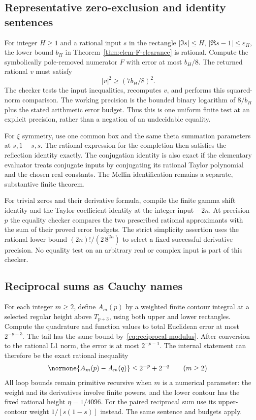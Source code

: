 \subsection{Representative zero-exclusion and identity sentences}
For integer $H\ge1$ and a rational input $s$ in the rectangle
$|\Im s|\le H$, $|\Re s-1|\le\varepsilon_H$, the lower bound
$b_H$ in Theorem~\ref{thm:elem-F-clearance} is rational. Compute the
symbolically pole-removed numerator $F$ with error at most $b_H/8$.
The returned rational $v$ must satisfy
\[
                         |v|^2\ge(7b_H/8)^2.
\]
The checker tests the input inequalities, recomputes $v$, and performs
this squared-norm comparison. The working precision is the bounded
binary logarithm of $8/b_H$ plus the stated arithmetic error budget.
Thus this is one uniform finite test at an explicit precision, rather
than a negation of an undecidable equality.

For $\xi$ symmetry, use one common box and the same theta summation
parameters at $s,1-s,\bar s$. The rational expression for the completion
then satisfies the reflection identity exactly. The conjugation identity
is also exact if the elementary evaluator treats conjugate inputs by
conjugating its rational Taylor polynomial and the chosen real constants.
The Mellin identification remains a separate, substantive finite theorem.

For trivial zeros and their derivative formula, compile the finite gamma
shift identity and the Taylor coefficient identity at the integer input
$-2n$. At precision $p$ the equality checker compares the two prescribed
rational approximants with the sum of their proved error budgets. The
strict simplicity assertion uses the rational lower bound
$(2n)!/(2\,8^{2n})$ to select a fixed successful derivative precision.
No equality test on an arbitrary real or complex input is part of this
checker.

\subsection{Reciprocal sums as Cauchy names}
For each integer $m\ge2$, define $A_m(p)$ by a weighted finite contour
integral at a selected regular height above $T_{p+3}$, using both
upper and lower rectangles. Compute the quadrature and function values
to total Euclidean error at most $2^{-p-3}$. The tail has the same
bound by~\eqref{eq:reciprocal-modulus}. After conversion to the
rational L1 norm, the error is at most $2^{-p-1}$. The internal
statement can therefore be the exact rational inequality
\begin{equation}
 \normone{A_m(p)-A_m(q)}\le2^{-p}+2^{-q}
       \qquad(m\ge2).
 \label{eq:cauchy-sentence}
\end{equation}
All loop bounds remain primitive recursive when $m$ is a numerical
parameter: the weight and its derivatives involve finite powers, and
the lower contour has the fixed rational height $\eta=1/4096$.
For the paired reciprocal sum use its upper-contour weight
$1/[s(1-s)]$ instead. The same sentence and budgets apply.

